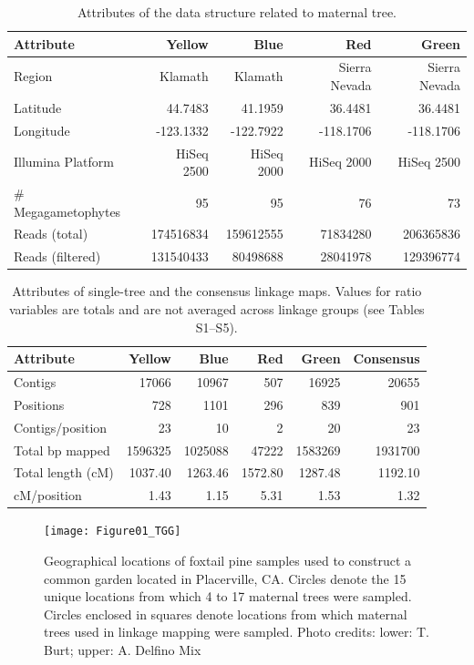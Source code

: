 \documentclass[smallextended]{svjour3}
\begin{document}
\begin{table}[ht]
\centering
\caption{Attributes of the data structure related to maternal tree.} 
\begin{tabular}{lrrrr}
\toprule
Attribute & Yellow & Blue & Red & Green\\
\midrule
Region & Klamath & Klamath & Sierra Nevada & Sierra Nevada \\
Latitude & 44.7483 & 41.1959 & 36.4481 & 36.4481 \\
Longitude & -123.1332 & -122.7922 & -118.1706 & -118.1706 \\
Illumina Platform & HiSeq 2500 & HiSeq 2000 & HiSeq 2000 & HiSeq 2500 \\
\# Megagametophytes & 95 & 95 & 76 & 73 \\
Reads (total) & \num{174516834} & \num{159612555} & \num{71834280} & \num{206365836} \\
Reads (filtered) & \num{131540433} & \num{80498688} & \num{28041978} & \num{129396774} \\
\bottomrule
\end{tabular}
\label{t:label}
\end{table}

\clearpage

\begin{table}[ht]
\centering
\caption{Attributes of single-tree and the consensus linkage maps. Values for ratio variables are totals and are not averaged 
  across linkage groups (see Tables S1--S5).} 

\begin{tabular}{lrrrrr}
\toprule
Attribute & Yellow & Blue & Red & Green & Consensus \\
\midrule
Contigs & 17066 & 10967 & 507 & 16925 & 20655 \\
Positions & 728 & 1101 & 296 & 839 & 901 \\
Contigs/position & 23 & 10 & 2 & 20 & 23 \\
Total bp mapped & \num{1596325} & \num{1025088} & \num{47222} & \num{1583269} & \num{1931700} \\
Total length (cM) & 1037.40 & 1263.46 & 1572.80 & 1287.48 & 1192.10 \\
cM/position & 1.43 & 1.15 & 5.31 & 1.53 & 1.32 \\
\bottomrule
\end{tabular}
\label{t:label}
\end{table}

\clearpage

\begin{figure}[ht]
\centering
\texttt{[image: Figure01\_TGG]}
\caption{Geographical locations of foxtail pine samples used to construct a
  common garden located in Placerville, CA. Circles denote the 15 unique
  locations from which 4 to 17 maternal trees were sampled. Circles enclosed
  in squares denote locations from which maternal trees used in linkage mapping
  were sampled. Photo credits: lower: T. Burt; upper: A. Delfino Mix}
\label{f:Figure01_TGG}
\end{figure}
\end{document}
